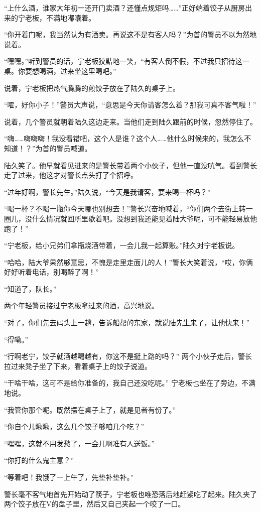 “上什么酒，谁家大年初一还开门卖酒？还懂点规矩吗……”正好端着饺子从厨房出来的宁老板，不满地嘟囔着。

“你开着门呢，我当然认为有酒卖。再说这不是有客人吗？”为首的警员不以为然地说着。

“嘿嘿。”听到警员的话，宁老板狡黠地一笑，“有客人倒不假，不过我只招待这一桌。你要想喝酒，过来坐这里喝吧。”

说着，宁老板把热气腾腾的煎饺子放在了陆久的桌子上。

“嚯，好你小子！”警员大声说，“意思是今天你请客怎么着？那我可真不客气啦！”

说着，几个警员就朝着陆久这边走来。当他们走到陆久跟前的时候，忽然停住了。

“嗨……嗨嗨嗨！我没看错吧，这个人是谁？这个人……他什么时候来的，我怎么不知道！？”为首的警员喊道。

陆久笑了。他早就看见进来的是警长带着两个小伙子，但他一直没吭气。看到警长走了过来，他这才对警长点头打了个招呼。

“过年好啊，警长先生。”陆久说，“今天是我请客，要来喝一杯吗？”

“喝一杯？不喝一瓶你今天哪也别想去！”警长兴奋地喊着，“你们两个去街上转一圈儿，没什么情况就回所里歇着吧。没想到我还能见着陆大爷呢，可不能轻易放他跑了！”

“宁老板，给小兄弟们拿瓶烧酒带着，一会儿我一起算账。”陆久对宁老板说。

“哈哈，陆大爷果然够意思，不愧是走里走面儿的人！”警长大笑着说，“哎，你俩好好听着电话，别喝醉了啊！”

“知道了，队长。”

两个年轻警员接过宁老板拿过来的酒，高兴地说。

“对了，你们先去码头上一趟，告诉船帮的东家，就说陆先生来了，让他快来！”

“得嘞。”

“行啊老宁，饺子就酒越喝越有，你这不是挺上路的吗？” 两个小伙子走后，警长拉过来凳子坐了下来，看着桌子上的饺子说道。

“干啥干啥，这可不是给你准备的，我自己还没吃呢。” 宁老板也坐在了旁边，不满地说。

“我管你那个呢。既然摆在桌子上了，就是见者有份了。”

“你自个儿瞅瞅，这么几个饺子够咱几个吃？”

“嘿嘿，这就不用发愁了，一会儿啊准有人送饭。”

“你打的什么鬼主意？”

“等着吧！我饿了一上午了，先垫补垫补。”

警长毫不客气地首先开始动了筷子，宁老板也唯恐落后地赶紧吃了起来。陆久夹了两个饺子放在V的盘子里，然后又自己夹起一个咬了一口。

